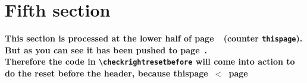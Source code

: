 \documentclass{article}
\newcommand\checkrightreset{%
  \ifextramarksmissing{left}
  {}
  {%
    \ifnum\extramarkslast{which}=0
      \extramarksreset{right}%
    \fi
  }%
}
\newcounter{thispage}
\newcommand\checkrightresetbefore{%
  \ifnum \value{thispage}<\value{page}\checkrightreset\fi
}
\begin{document}
\vspace{2cm}

\section{Fifth section}
\label{sec:push}

{\bfseries This section is processed at the lower half of  page~\thethispage\ (counter \texttt{thispage}). But as you can see it has been pushed to page~\pageref{sec:push}.\\
Therefore the code in \verb|\checkrightresetbefore| will come into action to do the reset before the header, because \mbox{thispage $<$ page}}

\medskip

\lipsum[1-6]
\end{document}
